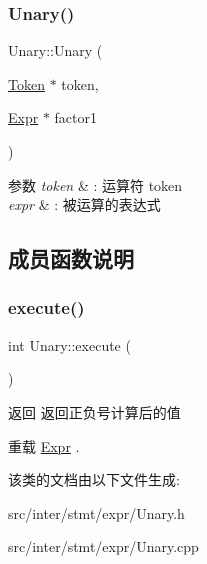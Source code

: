 \subsubsection{\texorpdfstring{Unary()}{Unary()}}
{\footnotesize\ttfamily Unary\+::\+Unary (\begin{DoxyParamCaption}\item[{\hyperlink{class_token}{Token} $\ast$}]{token,  }\item[{\hyperlink{class_expr}{Expr} $\ast$}]{factor1 }\end{DoxyParamCaption})}


\begin{DoxyParams}{参数}
{\em token} & \+: 运算符 token \\
\hline
{\em expr} & \+: 被运算的表达式 \\
\hline
\end{DoxyParams}


\subsection{成员函数说明}
\mbox{\label{class_unary_af42edff1ee4718a9afeb7127e41af758}} 
\subsubsection{\texorpdfstring{execute()}{execute()}}
{\footnotesize\ttfamily int Unary\+::execute (\begin{DoxyParamCaption}{ }\end{DoxyParamCaption})\hspace{0.3cm}{\ttfamily [virtual]}}

\begin{DoxyReturn}{返回}
返回正负号计算后的值 
\end{DoxyReturn}


重载 \hyperlink{class_expr_aff6a2e6eaa460e2a3db28ebdab089b51}{Expr} .



该类的文档由以下文件生成\+:\begin{DoxyCompactItemize}
\item 
src/inter/stmt/expr/Unary.\+h\item 
src/inter/stmt/expr/Unary.\+cpp\end{DoxyCompactItemize}
